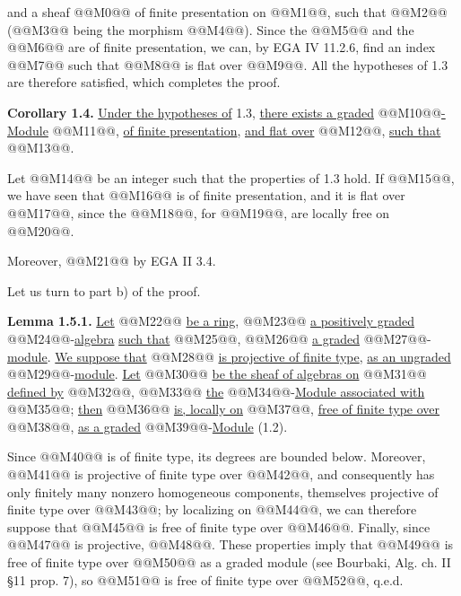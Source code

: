 and a sheaf @@M0@@ of finite presentation on @@M1@@, such that @@M2@@ (@@M3@@ being the morphism @@M4@@). Since the @@M5@@ and the @@M6@@ are of finite presentation, we can, by EGA IV 11.2.6, find an index @@M7@@ such that @@M8@@ is flat over @@M9@@. All the hypotheses of 1.3 are therefore satisfied, which completes the proof.

\textbf{Corollary 1.4.} \uline{Under the hypotheses of} 1.3, \uline{there exists a graded} @@M10@@\uline{-Module} @@M11@@, \uline{of finite presentation}, \uline{and flat over} @@M12@@, \uline{such that} @@M13@@.

Let @@M14@@ be an integer such that the properties of 1.3 hold. If @@M15@@, we have seen that @@M16@@ is of finite presentation, and it is flat over @@M17@@, since the @@M18@@, for @@M19@@, are locally free on @@M20@@.

Moreover, @@M21@@ by EGA II 3.4.

Let us turn to part b) of the proof.

\textbf{Lemma 1.5.1.} \uline{Let} @@M22@@ \uline{be a ring}, @@M23@@ \uline{a positively graded} @@M24@@-\uline{algebra} \uline{such that} @@M25@@, @@M26@@ \uline{a graded} @@M27@@-\uline{module}. \uline{We suppose that} @@M28@@ \uline{is projective of finite type}, \uline{as an ungraded} @@M29@@-\uline{module}. \uline{Let} @@M30@@ \uline{be the sheaf of algebras on} @@M31@@ \uline{defined by} @@M32@@, @@M33@@ \uline{the} @@M34@@-\uline{Module associated with} @@M35@@; \uline{then} @@M36@@ \uline{is, locally on} @@M37@@, \uline{free of finite type over} @@M38@@, \uline{as a graded} @@M39@@-\uline{Module} (1.2).

Since @@M40@@ is of finite type, its degrees are bounded below. Moreover, @@M41@@ is projective of finite type over @@M42@@, and consequently has only finitely many nonzero homogeneous components, themselves projective of finite type over @@M43@@; by localizing on @@M44@@, we can therefore suppose that @@M45@@ is free of finite type over @@M46@@. Finally, since @@M47@@ is projective, @@M48@@. These properties imply that @@M49@@ is free of finite type over @@M50@@ as a graded module (see Bourbaki, Alg. ch. II §11 prop. 7), so @@M51@@ is free of finite type over @@M52@@, q.e.d.

